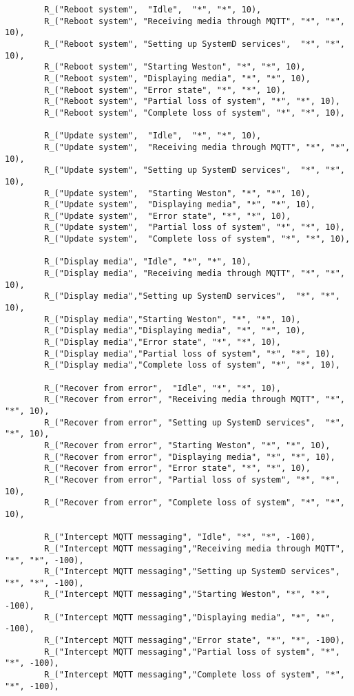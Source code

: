 \documentclass[language=english,version=final,mainfont=none,sharelatex=false]{utuftthesis}
\begin{document}
\begin{verbatim}
        R_("Reboot system",  "Idle",  "*", "*", 10),
        R_("Reboot system", "Receiving media through MQTT", "*", "*", 10),
        R_("Reboot system", "Setting up SystemD services",  "*", "*", 10),
        R_("Reboot system", "Starting Weston", "*", "*", 10),
        R_("Reboot system", "Displaying media", "*", "*", 10),
        R_("Reboot system", "Error state", "*", "*", 10),
        R_("Reboot system", "Partial loss of system", "*", "*", 10),
        R_("Reboot system", "Complete loss of system", "*", "*", 10),

        R_("Update system",  "Idle",  "*", "*", 10),
        R_("Update system",  "Receiving media through MQTT", "*", "*", 10),
        R_("Update system", "Setting up SystemD services",  "*", "*", 10),
        R_("Update system",  "Starting Weston", "*", "*", 10),
        R_("Update system",  "Displaying media", "*", "*", 10),
        R_("Update system",  "Error state", "*", "*", 10),
        R_("Update system",  "Partial loss of system", "*", "*", 10),
        R_("Update system",  "Complete loss of system", "*", "*", 10),

        R_("Display media", "Idle", "*", "*", 10),
        R_("Display media", "Receiving media through MQTT", "*", "*", 10),
        R_("Display media","Setting up SystemD services",  "*", "*", 10),
        R_("Display media","Starting Weston", "*", "*", 10),
        R_("Display media","Displaying media", "*", "*", 10),
        R_("Display media","Error state", "*", "*", 10),
        R_("Display media","Partial loss of system", "*", "*", 10),
        R_("Display media","Complete loss of system", "*", "*", 10),

        R_("Recover from error",  "Idle", "*", "*", 10),
        R_("Recover from error", "Receiving media through MQTT", "*", "*", 10),
        R_("Recover from error", "Setting up SystemD services",  "*", "*", 10),
        R_("Recover from error", "Starting Weston", "*", "*", 10),
        R_("Recover from error", "Displaying media", "*", "*", 10),
        R_("Recover from error", "Error state", "*", "*", 10),
        R_("Recover from error", "Partial loss of system", "*", "*", 10),
        R_("Recover from error", "Complete loss of system", "*", "*", 10),

        R_("Intercept MQTT messaging", "Idle", "*", "*", -100),
        R_("Intercept MQTT messaging","Receiving media through MQTT", "*", "*", -100),
        R_("Intercept MQTT messaging","Setting up SystemD services",  "*", "*", -100),
        R_("Intercept MQTT messaging","Starting Weston", "*", "*", -100),
        R_("Intercept MQTT messaging","Displaying media", "*", "*", -100),
        R_("Intercept MQTT messaging","Error state", "*", "*", -100),
        R_("Intercept MQTT messaging","Partial loss of system", "*", "*", -100),
        R_("Intercept MQTT messaging","Complete loss of system", "*", "*", -100),


\end{verbatim}
\end{document}
